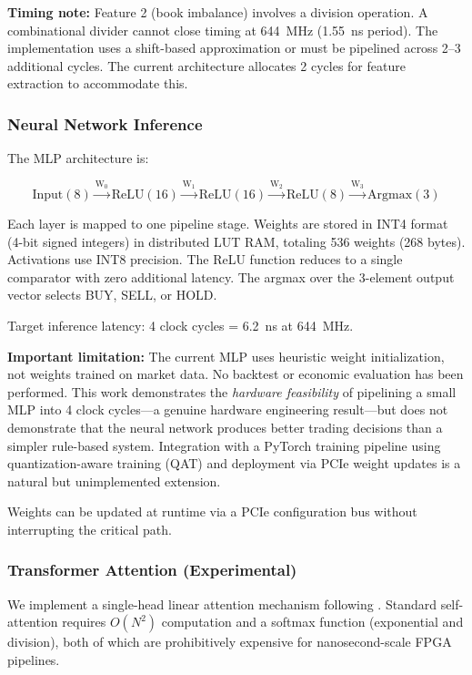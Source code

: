 \documentclass[conference,10pt]{IEEEtran}
\begin{document}
\textbf{Timing note:} Feature 2 (book imbalance) involves a division operation. A combinational divider cannot close timing at 644~MHz (1.55~ns period). The implementation uses a shift-based approximation or must be pipelined across 2--3 additional cycles. The current architecture allocates 2 cycles for feature extraction to accommodate this.

\subsubsection{Neural Network Inference}

The MLP architecture is:

\begin{equation}
\text{Input}(8) \xrightarrow{\text{W}_0} \text{ReLU}(16) \xrightarrow{\text{W}_1} \text{ReLU}(16) \xrightarrow{\text{W}_2} \text{ReLU}(8) \xrightarrow{\text{W}_3} \text{Argmax}(3)
\end{equation}

Each layer is mapped to one pipeline stage. Weights are stored in INT4 format (4-bit signed integers) in distributed LUT RAM, totaling 536 weights (268 bytes). Activations use INT8 precision. The ReLU function reduces to a single comparator with zero additional latency. The argmax over the 3-element output vector selects BUY, SELL, or HOLD.

Target inference latency: 4 clock cycles = 6.2~ns at 644~MHz.

\textbf{Important limitation:} The current MLP uses heuristic weight initialization, not weights trained on market data. No backtest or economic evaluation has been performed. This work demonstrates the \textit{hardware feasibility} of pipelining a small MLP into 4 clock cycles---a genuine hardware engineering result---but does not demonstrate that the neural network produces better trading decisions than a simpler rule-based system. Integration with a PyTorch training pipeline using quantization-aware training (QAT) and deployment via PCIe weight updates is a natural but unimplemented extension.

Weights can be updated at runtime via a PCIe configuration bus without interrupting the critical path.

\subsubsection{Transformer Attention (Experimental)}

We implement a single-head linear attention mechanism following \cite{katharopoulos2020}. Standard self-attention requires $O(N^2)$ computation and a softmax function (exponential and division), both of which are prohibitively expensive for nanosecond-scale FPGA pipelines.
\end{document}
